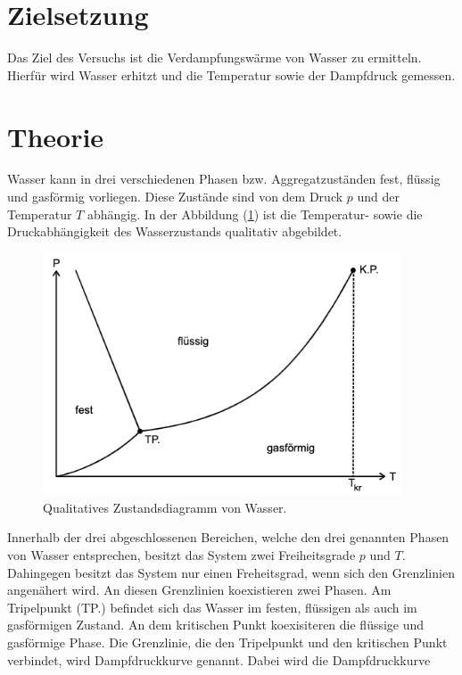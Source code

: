 \section{Zielsetzung}
\label{sec:Zielsetzung}
\nocite{anleitungV203}
Das Ziel des Versuchs ist die Verdampfungswärme von Wasser zu ermitteln. Hierfür wird Wasser erhitzt und
die Temperatur sowie der Dampfdruck gemessen.

\section{Theorie}
\label{sec:Theorie}
Wasser kann in drei verschiedenen Phasen bzw. Aggregatzuständen fest, flüssig und gasförmig vorliegen.
Diese Zustände sind von dem Druck $p$ und der Temperatur $T$ abhängig. In der Abbildung (\ref{fig:ZustandsdiagrammWasser})
ist die Temperatur- sowie die Druckabhängigkeit des Wasserzustands qualitativ abgebildet.
\begin{figure}[H]
    \centering
    \includegraphics[width=0.95\textwidth]{ZustandsdiagrammWasser.png}
    \caption{Qualitatives Zustandsdiagramm von Wasser. \cite{anleitungV203}}
    \label{fig:ZustandsdiagrammWasser}
\end{figure}
Innerhalb der drei abgeschlossenen Bereichen, welche den drei genannten Phasen von Wasser entsprechen, besitzt das System 
zwei Freiheitsgrade $p$ und $T$. Dahingegen besitzt das System nur einen Freheitsgrad, wenn sich den Grenzlinien angenähert wird. An diesen
Grenzlinien koexistieren zwei Phasen. Am Tripelpunkt (TP.) befindet sich das Wasser im festen, flüssigen als auch im gasförmigen Zustand.
An dem kritischen Punkt koexisiteren die flüssige und gasförmige Phase. 
Die Grenzlinie, die den Tripelpunkt und den kritischen Punkt verbindet, wird Dampfdruckkurve genannt. Dabei wird die Dampfdruckkurve
